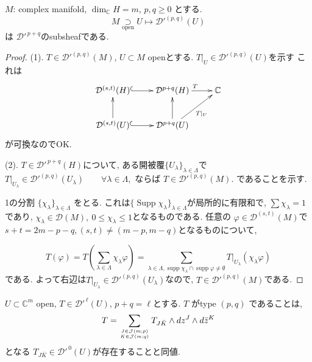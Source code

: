 \begin{tcolorbox}[mybox]
\begin{lem}
\label{lem-M-4.9}
\(M\): complex manifold, \(\dim_{\mathbb{C}}H=m\), \(p,q\geq 0\)
とする. 
\[
M \underset{\text{open}}{\supset} U \longmapsto \mathcal{D}'^{(p,q)}(U)
\]
は \(\mathcal{D}'^{\,p+q}\)のsubsheafである. 
\end{lem}
\end{tcolorbox}

\begin{proof}

(1). \(T\in \mathcal{D}'^{(p,q)}(M)\), \(U\subset M\) openとする. 
\(T|_U \in \mathcal{D}'^{(p,q)}(U)\)を示す
これは\[
\xymatrix{
\mathcal{D}^{(s,t)}(H) \ar@{^{(}->}[r] & \mathcal{D}^{p+q}(H) \ar[r]^{T} &   \mathbb{C}\\
\mathcal{D}^{(s,t)}(U) \ar@{^{(}->}[r] \ar[u] & \mathcal{D}^{p+q}(U) \ar[u] \ar[ur]_{T|_{U}} & 
}
\]
が可換なのでOK.

(2).
 \(T\in \mathcal{D}'^{\,p+q}(H)\)について, ある開被覆\( \{U_{\lambda}\}_{\lambda\in\Lambda}\)で
\(T|_{U_{\lambda}}\in \mathcal{D}'^{(p,q)}(U_{\lambda}) \qquad \forall \lambda\in\Lambda,
\)
ならば
\(
T\in \mathcal{D}'^{(p,q)}(M).
\)
であることを示す. 

1の分割
\(\{\chi_{\lambda}\}_{\lambda\in\Lambda}\) をとる. 
これは\(\{\operatorname{Supp}\chi_{\lambda}\}_{\lambda\in\Lambda}\)が局所的に有限和で, $ \sum \chi_{\lambda}=1$であり, 
\(
\chi_{\lambda}\in \mathcal{D}(M),\ 0\leq \chi_{\lambda}\leq 1
\)となるものである. 
任意の \(\varphi\in \mathcal{D}^{(s,t)}(M)\)で
\(
s+t=2m-p-q, (s,t)\neq (m-p,m-q)
\)となるものについて, 

\[
T(\varphi)=
T\left(\sum_{\lambda\in\Lambda}\chi_{\lambda}\varphi\right)
=\sum_{\lambda\in\Lambda, \operatorname{supp}\chi_{\lambda}\cap \operatorname{supp}\varphi \neq \emptyset}
T|_{U_{\lambda}}(\chi_{\lambda}\varphi)
\]
である. 
よって右辺は$T|_{U_{\lambda}}\in \mathcal{D}'^{(p,q)}(U_{\lambda})$なので, $T\in \mathcal{D}'^{(p,q)}(M)$である. 
\end{proof}





\begin{tcolorbox}[mybox]
\begin{lem}
\label{lem-M-4.10}
\(U\subset \mathbb{C}^{m}\) open, \(T\in \mathcal{D}'^{\,\ell}(U)\), \(p+q=\ell\)とする. 
\(T\) がtype \((p,q)\) であることは, 
\[
T=\sum_{J\in \mathcal{J}(m;p)\atop K\in \mathcal{J}(m;q)} T_{J\bar{K}}\wedge dz^{J}\wedge d\bar{z}^{K}
\]
となる \(T_{J\bar{K}}\in \mathcal{D}'^{\,0}(U)\)が存在することと同値. 
\end{lem}
\end{tcolorbox}

